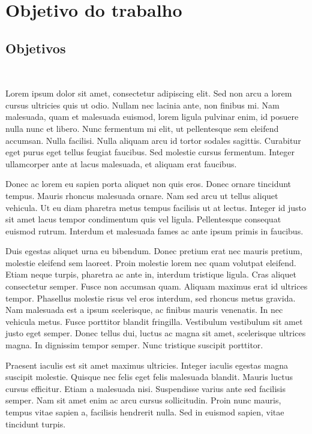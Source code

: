 \documentclass[11pt, a4paper]{article} %
\begin{document}



\newpage
\section{Objetivo do trabalho} %
\subsection{Objetivos} %
\textcolor{white}{.}\par
Lorem ipsum dolor sit amet, consectetur adipiscing elit. Sed non arcu a lorem cursus ultricies quis ut odio. Nullam nec lacinia ante, non finibus mi. Nam malesuada, quam et malesuada euismod, lorem ligula pulvinar enim, id posuere nulla nunc et libero. Nunc fermentum mi elit, ut pellentesque sem eleifend accumsan. Nulla facilisi. Nulla aliquam arcu id tortor sodales sagittis. Curabitur eget purus eget tellus feugiat faucibus. Sed molestie cursus fermentum. Integer ullamcorper ante at lacus malesuada, et aliquam erat faucibus.

Donec ac lorem eu sapien porta aliquet non quis eros. Donec ornare tincidunt tempus. Mauris rhoncus malesuada ornare. Nam sed arcu ut tellus aliquet vehicula. Ut eu diam pharetra metus tempus facilisis ut at lectus. Integer id justo sit amet lacus tempor condimentum quis vel ligula. Pellentesque consequat euismod rutrum. Interdum et malesuada fames ac ante ipsum primis in faucibus.

Duis egestas aliquet urna eu bibendum. Donec pretium erat nec mauris pretium, molestie eleifend sem laoreet. Proin molestie lorem nec quam volutpat eleifend. Etiam neque turpis, pharetra ac ante in, interdum tristique ligula. Cras aliquet consectetur semper. Fusce non accumsan quam. Aliquam maximus erat id ultrices tempor. Phasellus molestie risus vel eros interdum, sed rhoncus metus gravida. Nam malesuada est a ipsum scelerisque, ac finibus mauris venenatis. In nec vehicula metus. Fusce porttitor blandit fringilla. Vestibulum vestibulum sit amet justo eget semper. Donec tellus dui, luctus ac magna sit amet, scelerisque ultrices magna. In dignissim tempor semper. Nunc tristique suscipit porttitor.

Praesent iaculis est sit amet maximus ultricies. Integer iaculis egestas magna suscipit molestie. Quisque nec felis eget felis malesuada blandit. Mauris luctus cursus efficitur. Etiam a malesuada nisi. Suspendisse varius ante sed facilisis semper. Nam sit amet enim ac arcu cursus sollicitudin. Proin nunc mauris, tempus vitae sapien a, facilisis hendrerit nulla. Sed in euismod sapien, vitae tincidunt turpis.
\end{document}

